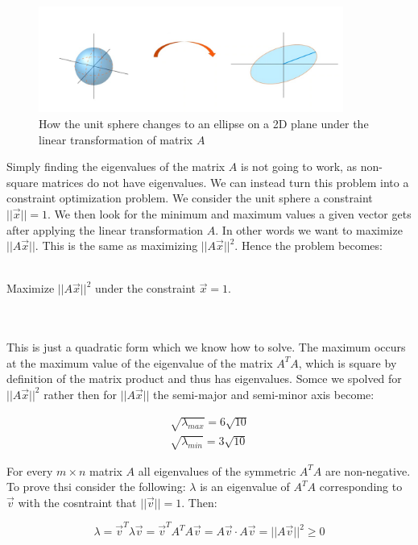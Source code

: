 \documentclass[11pt, a4paper]{article}
\begin{document}
\begin{figure}[H]
  \centerline{\includegraphics[width=100mm]{images/Transformation_2.png}}
  \caption{How the unit sphere changes to an ellipse on a 2D plane under the linear transformation of matrix $A$}
\end{figure}

Simply finding the eigenvalues of the matrix $A$ is not going to work, as non-square matrices do not have eigenvalues. We can instead turn this problem into a constraint optimization problem. We consider the unit sphere a constraint $||\vec{x}|| = 1$. We then look for the minimum and maximum values a given vector gets after applying the linear transformation $A$. In other words we want to maximize $||A\vec{x}||$. This is the same as maximizing $||A\vec{x}||^2$. Hence the problem becomes:\\
\\
\centerline{Maximize $||A\vec{x}||^2$ under the constraint $\vec{x}=1$.}\\
\\
This is just a quadratic form which we know how to solve. The maximum occurs at the maximum value of the eigenvalue of the matrix $A^TA$, which is square by definition of the matrix product and thus has eigenvalues. Somce we spolved for $||A\vec{x}||^2$ rather then for $||A\vec{x}||$ the semi-major and semi-minor axis become:

\begin{gather}
	\sqrt{\lambda_{max}} = 6\sqrt{10}\\
	\sqrt{\lambda_{min}} = 3\sqrt{10}
\end{gather}

For every $m \times n$ matrix $A$ all eigenvalues of the symmetric $A^TA$ are non-negative. To prove thsi consider the following: $\lambda$ is an eigenvalue of $A^TA$ corresponding to $\vec{v}$ with the cosntraint that $||\vec{v}|| = 1$. Then:

\begin{equation}
	\lambda = \vec{v}^T\lambda \vec{v} = \vec{v}^T A^T A \vec{v} = A\vec{v} \cdot A \vec{v} = ||A\vec{v}||^2 \geq 0
\end{equation}
\end{document}
